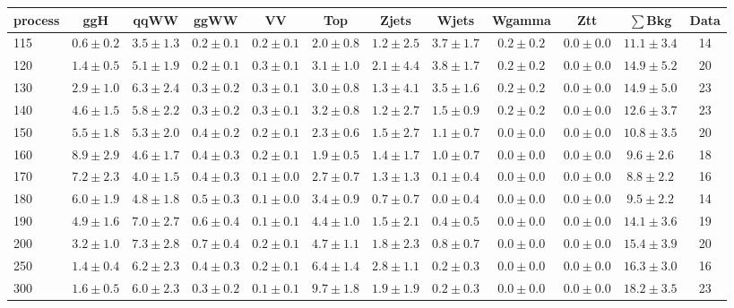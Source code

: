 \begin{table}[!hb]
{\footnotesize
 \begin{center}
 \begin{tabular}{l c c c c c c c c c c c }
 \hline
 process & ggH & qqWW & ggWW & VV & Top & Zjets & Wjets & Wgamma & Ztt & $\sum$Bkg & Data \\
 \hline
115 & $0.6\pm0.2$ & $3.5\pm1.3$ & $0.2\pm0.1$ & $0.2\pm0.1$ & $2.0\pm0.8$ & $1.2\pm2.5$ & $3.7\pm1.7$ & $0.2\pm0.2$ & $0.0\pm0.0$ & $11.1\pm3.4$ & 14 \\
120 & $1.4\pm0.5$ & $5.1\pm1.9$ & $0.2\pm0.1$ & $0.3\pm0.1$ & $3.1\pm1.0$ & $2.1\pm4.4$ & $3.8\pm1.7$ & $0.2\pm0.2$ & $0.0\pm0.0$ & $14.9\pm5.2$ & 20 \\
130 & $2.9\pm1.0$ & $6.3\pm2.4$ & $0.3\pm0.2$ & $0.3\pm0.1$ & $3.0\pm0.8$ & $1.3\pm4.1$ & $3.5\pm1.6$ & $0.2\pm0.2$ & $0.0\pm0.0$ & $14.9\pm5.0$ & 23 \\
140 & $4.6\pm1.5$ & $5.8\pm2.2$ & $0.3\pm0.2$ & $0.3\pm0.1$ & $3.2\pm0.8$ & $1.2\pm2.7$ & $1.5\pm0.9$ & $0.2\pm0.2$ & $0.0\pm0.0$ & $12.6\pm3.7$ & 23 \\
150 & $5.5\pm1.8$ & $5.3\pm2.0$ & $0.4\pm0.2$ & $0.2\pm0.1$ & $2.3\pm0.6$ & $1.5\pm2.7$ & $1.1\pm0.7$ & $0.0\pm0.0$ & $0.0\pm0.0$ & $10.8\pm3.5$ & 20 \\
160 & $8.9\pm2.9$ & $4.6\pm1.7$ & $0.4\pm0.3$ & $0.2\pm0.1$ & $1.9\pm0.5$ & $1.4\pm1.7$ & $1.0\pm0.7$ & $0.0\pm0.0$ & $0.0\pm0.0$ & $9.6\pm2.6$ & 18 \\
170 & $7.2\pm2.3$ & $4.0\pm1.5$ & $0.4\pm0.3$ & $0.1\pm0.0$ & $2.7\pm0.7$ & $1.3\pm1.3$ & $0.1\pm0.4$ & $0.0\pm0.0$ & $0.0\pm0.0$ & $8.8\pm2.2$ & 16 \\
180 & $6.0\pm1.9$ & $4.8\pm1.8$ & $0.5\pm0.3$ & $0.1\pm0.0$ & $3.4\pm0.9$ & $0.7\pm0.7$ & $0.0\pm0.4$ & $0.0\pm0.0$ & $0.0\pm0.0$ & $9.5\pm2.2$ & 14 \\
190 & $4.9\pm1.6$ & $7.0\pm2.7$ & $0.6\pm0.4$ & $0.1\pm0.1$ & $4.4\pm1.0$ & $1.5\pm2.1$ & $0.4\pm0.5$ & $0.0\pm0.0$ & $0.0\pm0.0$ & $14.1\pm3.6$ & 19 \\
200 & $3.2\pm1.0$ & $7.3\pm2.8$ & $0.7\pm0.4$ & $0.2\pm0.1$ & $4.7\pm1.1$ & $1.8\pm2.3$ & $0.8\pm0.7$ & $0.0\pm0.0$ & $0.0\pm0.0$ & $15.4\pm3.9$ & 20 \\
250 & $1.4\pm0.4$ & $6.2\pm2.3$ & $0.4\pm0.3$ & $0.2\pm0.1$ & $6.4\pm1.4$ & $2.8\pm1.1$ & $0.2\pm0.3$ & $0.0\pm0.0$ & $0.0\pm0.0$ & $16.3\pm3.0$ & 16 \\
300 & $1.6\pm0.5$ & $6.0\pm2.3$ & $0.3\pm0.2$ & $0.1\pm0.1$ & $9.7\pm1.8$ & $1.9\pm1.9$ & $0.2\pm0.3$ & $0.0\pm0.0$ & $0.0\pm0.0$ & $18.2\pm3.5$ & 23 \\

\end{tabular}
\end{center}}
\end{table}
